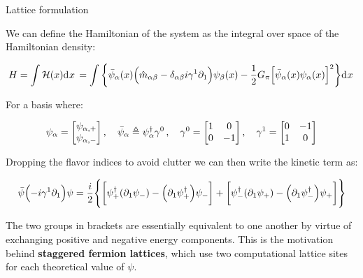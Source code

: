 \begin{frame}[allowframebreaks]{Lattice formulation}

	We can define the Hamiltonian of the system as the integral over space of the Hamiltonian density:

	\begin{gather*}
		H = \int \mathcal{H}(x) \text{d}^{}x\,
	    = \int \qty{
	      \bar{\psi}_{\alpha}(x)
	      \qty(\hat{m}_{\alpha\beta} - \delta_{\alpha\beta}i\gamma^{1}\partial_{1})
	      \psi_{\beta}(x) -
	      \frac{1}{2}G_{\pi}
	      \qty[\bar{\psi}_{\alpha}(x)\psi_{\alpha}(x)]^{2}} \text{d}^{}x\,
	\end{gather*}

	For a basis where:

	\begin{gather*}
		\psi_{\alpha} = \mqty[\psi_{\alpha,+} \\ \psi_{\alpha,-}] \qc
	  \bar{\psi}_{\alpha} \defeq \psi^{\dagger}_{\alpha}\gamma^{0} \qc
		\gamma^{0} = \mqty[1 & 0\\ 0 & -1] \qc
	  \gamma^{1} = \mqty[0 & -1\\ 1 & 0]
	\end{gather*}

	Dropping the flavor indices to avoid clutter we can then write the kinetic term as:

	\begin{gather*}
	  \bar{\psi}\qty(-i\gamma^{1}\partial_{1})\psi =
			\frac{i}{2} \qty{
	      \qty[ \psi^{\dagger}_{+} \qty(\partial_{1}\psi_{-}) -
	      \qty(\partial_{1}\psi^{\dagger}_{+}) \psi_{-} ] +
	      \qty[ \psi^{\dagger}_{-} \qty(\partial_{1}\psi_{+}) -
	      \qty(\partial_{1}\psi^{\dagger}_{-}) \psi_{+} ]
	    }
	\end{gather*}

\break

	The two groups in brackets are essentially equivalent to one another by virtue of exchanging positive and negative energy components. This is the motivation behind \textbf{staggered fermion lattices}, which use two computational lattice sites for each theoretical value of $\psi$.


\end{frame}

